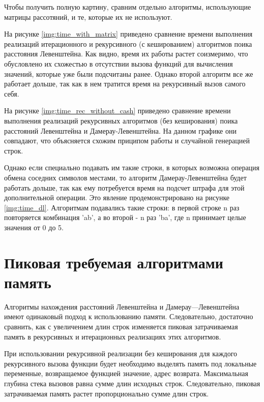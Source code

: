  Чтобы получить полную картину, сравним отдельно алгоритмы, использующие матрицы рассотяний, и те, которые их не используют.
 
 На рисунке \ref{img:time_with_matrix} приведено сравнение времени выполнения реализаций итерационного и рекурсивного (с кешированием) алгоритмов поика расстояния Левенштейна. Как видно, время их работы растет соизмеримо, что обусловлено их схожестью в отсутствии вызова функций для вычисления значений, которые уже были подсчитаны ранее. Однако второй алгоритм все же работает дольше, так как в нем тратится время на рекурсивный вызов самого себя. 
 
 
 На рисунке \ref{img:time_rec_without_cash} приведено сравнение времени выполнения реализаций рекурсивных алгоритмов (без кеширования) поика расстояний Левенштейна и Дамерау-Левенштейна. На данном графике они совпадают, что объясняется схожим приципом работы и случайной генерацией строк. 
 
 
 
 
 Однако если специально подавать им такие строки, в которых возможна операция обмена соседних символов местами, то алгоритм Дамерау-Левенштейна будет работать дольше, так как ему потребуется время на подсчет штрафа для этой дополнительной операции. Это явление продемонстрировано на рисунке \ref{img:time_dl}. Алгоритмам подавались такие строки: в первой строке n раз повторяется комбинация 'ab', а во второй - n раз 'ba', где n принимает целые значения от 0 до 5.




\section{Пиковая требуемая алгоритмами память}

Алгоритмы нахождения расстояний Левенштейна и Дамерау—Левенштейна имеют одинаковый подход к использованию памяти. Следовательно, достаточно сравнить, как с увеличением длин строк изменяется пиковая затрачиваемая память в рекурсивных и итерационных реализациях этих алгоритмов. 

При использовании рекурсивной реализации без кеширования для каждого рекурсивного вызова функции будет необходимо выделять память под локальные переменные, возвращаемое функцией значение, адрес возврата. Максимальная глубина стека вызовов равна сумме длин исходных строк. Следовательно, пиковая затрачиваемая память растет пропорционально сумме длин строк. 

